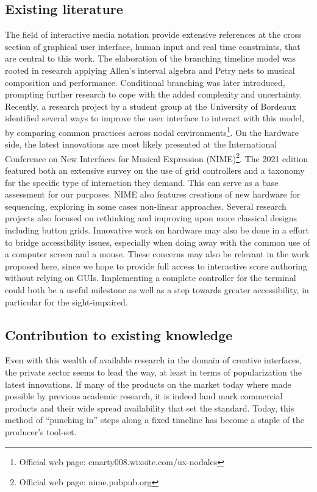 \documentclass[journal,onecolumn]{IEEEtran}
\begin{document}
\subsection{Existing literature}
The field of interactive media notation\cite{ircam:antescofo}\cite{buzzing:iannix}\cite{grame:inscore} provide extensive references at the cross section of graphical user interface, human input and real time constraints, that are central to this work. 
The elaboration of the branching timeline model was rooted in research applying Allen's interval algebra\cite{allombert:constraint} and Petry nets\cite{allombert:petri} to musical composition and performance. Conditional branching was later introduced\cite{toro:condition}, prompting further research to cope with the added complexity and uncertainty\cite{arias:colour}. Recently, a research project by a student group at the University of Bordeaux identified several ways to improve the user interface to interact with this model, by comparing common practices across nodal environments\footnote{Official web page: cmarty008.wixsite.com/ux-nodales}. On the hardware side, the latest innovations are most likely presented at the International Conference on New Interfaces for Musical Expression (NIME)\footnote{Official web page: nime.pubpub.org}. The 2021 edition featured both an extensive survey on the use of grid controllers\cite{rossmy:grid} and a taxonomy for the specific type of interaction they demand\cite{pust:taxonomy}. This can serve as a base assessment for our purposes. 
NIME also features creations of new hardware for sequencing\cite{arellano:radear}, exploring in some cases non-linear approaches\cite{hayes:neurohedron}. Several research projects also focused on rethinking and improving upon more classical designs\cite{snyder:jd} including button grids\cite{rossmy:touch}. Innovative work on hardware may also be done in a effort to bridge accessibility issues\cite{forester:loopblocks}, especially when doing away with the common use of a computer screen and a mouse. These concerns may also be relevant in the work proposed here, since we hope to provide full access to interactive score authoring without relying on GUIs. Implementing a complete controller for the terminal could both be a useful milestone as well as a step towards greater accessibility, in particular for the sight-impaired. 

\subsection{Contribution to existing knowledge}
Even with this wealth of available research in the domain of creative interfaces, the private sector seems to lead the way, at least in terms of popularization the latest innovations. If many of the products on the market today where made possible by previous academic research, it is indeed land mark commercial products and their wide spread availability that set the standard. Today, this method of ``punching in'' steps along a fixed timeline has become a staple of the producer's tool-set.
\end{document}
